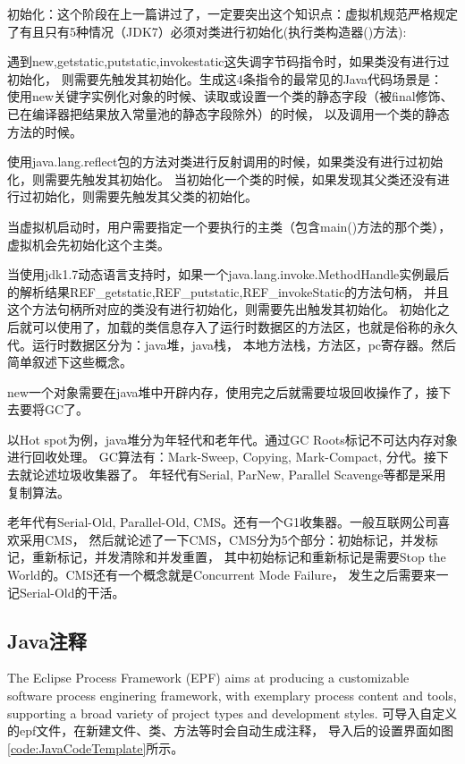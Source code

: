 \documentclass{book}
\begin{document}
初始化：这个阶段在上一篇讲过了，一定要突出这个知识点：虚拟机规范严格规定了有且只有5种情况（JDK7）必须对类进行初始化(执行类构造器()方法):

遇到new,getstatic,putstatic,invokestatic这失调字节码指令时，如果类没有进行过初始化，
则需要先触发其初始化。生成这4条指令的最常见的Java代码场景是：
使用new关键字实例化对象的时候、读取或设置一个类的静态字段（被final修饰、已在编译器把结果放入常量池的静态字段除外）的时候，
以及调用一个类的静态方法的时候。

使用java.lang.reflect包的方法对类进行反射调用的时候，如果类没有进行过初始化，则需要先触发其初始化。
当初始化一个类的时候，如果发现其父类还没有进行过初始化，则需要先触发其父类的初始化。

当虚拟机启动时，用户需要指定一个要执行的主类（包含main()方法的那个类），虚拟机会先初始化这个主类。

当使用jdk1.7动态语言支持时，如果一个java.lang.invoke.MethodHandle实例最后的解析结果REF\_getstatic,REF\_putstatic,REF\_invokeStatic的方法句柄，
并且这个方法句柄所对应的类没有进行初始化，则需要先出触发其初始化。
初始化之后就可以使用了，加载的类信息存入了运行时数据区的方法区，也就是俗称的永久代。运行时数据区分为：java堆，java栈，
本地方法栈，方法区，pc寄存器。然后简单叙述下这些概念。

new一个对象需要在java堆中开辟内存，使用完之后就需要垃圾回收操作了，接下去要将GC了。

以Hot spot为例，java堆分为年轻代和老年代。通过GC Roots标记不可达内存对象进行回收处理。
GC算法有：Mark-Sweep, Copying, Mark-Compact, 分代。接下去就论述垃圾收集器了。
年轻代有Serial, ParNew, Parallel Scavenge等都是采用复制算法。

老年代有Serial-Old, Parallel-Old, CMS。还有一个G1收集器。一般互联网公司喜欢采用CMS，
然后就论述了一下CMS，CMS分为5个部分：初始标记，并发标记，重新标记，并发清除和并发重置，
其中初始标记和重新标记是需要Stop the World的。CMS还有一个概念就是Concurrent Mode Failure，
发生之后需要来一记Serial-Old的干活。


\subsection{Java注释}

The Eclipse Process Framework (EPF) aims at producing a customizable software process enginering framework, 
with exemplary process content and tools, supporting a broad variety of project types and development styles.
可导入自定义的epf文件，在新建文件、类、方法等时会自动生成注释，
导入后的设置界面如图\ref{code:JavaCodeTemplate}所示。
\end{document}
